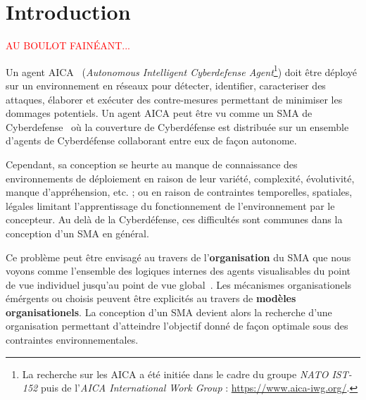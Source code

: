 \documentclass[demonstration]{jfsma}
\newcommand{\rem}[1]{\textcolor{red}{#1}}
\begin{document}

\section{Introduction}

\rem{AU BOULOT FAINÉANT... }



Un agent AICA~\cite{Kott2023}
%
(\emph{Autonomous Intelligent Cyberdefense Agent}\footnote{La recherche sur les AICA a été initiée dans le cadre du groupe \emph{NATO IST-152} puis de l'\emph{AICA International Work Group} : \url{https://www.aica-iwg.org/}.})
%
doit être déployé sur un environnement en réseaux pour détecter, identifier, caracteriser des attaques, élaborer et exécuter des contre-mesures permettant de minimiser les dommages potentiels.
Un agent AICA peut être vu comme un SMA de Cyberdefense~\cite{Singh2015} où la couverture de Cyberdéfense est distribuée sur un ensemble d'agents de Cyberdéfense collaborant entre eux de façon autonome.

Cependant, sa conception se heurte au manque de connaissance des environnements de déploiement en raison de leur variété, complexité, évolutivité, manque d'appréhension, etc. ; ou en raison de contraintes temporelles, spatiales, légales limitant l'apprentissage du fonctionnement de l'environnement par le concepteur. Au delà de la Cyberdéfense, ces difficultés sont communes dans la conception d'un SMA en général.

Ce problème peut être envisagé au travers de l'\textbf{organisation} du SMA que nous voyons comme l'ensemble des logiques internes des agents visualisables du point de vue individuel jusqu'au point de vue global~\cite{Picard2009}. Les mécanismes organisationels émérgents ou choisis peuvent être explicités au travers de \textbf{modèles organisationels}.
La conception d'un SMA devient alors la recherche d'une organisation permettant d'atteindre l'objectif donné de façon optimale sous des contraintes environnementales.
\end{document}
